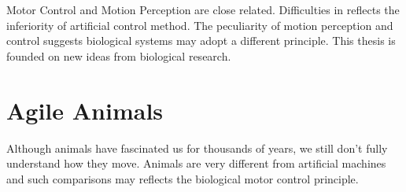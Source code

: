 Motor Control and Motion Perception are close related.
Difficulties in \cms reflects the inferiority of artificial control method.
The peculiarity of motion perception and control suggests  biological systems may adopt a different principle.
This thesis is founded on new ideas from biological research.

 

\section{Agile Animals}
Although animals have fascinated us for thousands of years, we still don't fully understand how they move.
Animals are very different from artificial machines and such comparisons may reflects the  biological motor control principle.

